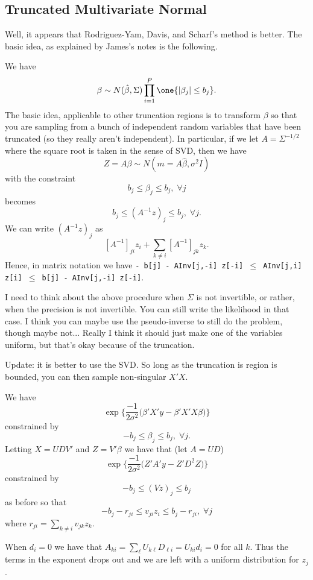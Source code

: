 \documentclass{article}
\begin{document}
\subsection{Truncated Multivariate Normal}

Well, it appears that Rodriguez-Yam, Davis, and Scharf's method is better.  The
basic idea, as explained by James's notes is the following.

We have
\[
\beta \sim N(\hat \beta, \Sigma) \prod_{i=1}^P \one \{|\beta_j| \leq b_j \}.
\]
The basic idea, applicable to other truncation regions is to transform $\beta$
so that you are sampling from a bunch of independent random variables that have
been truncated (so they really aren't independent).  In particular, if we let $A
= \Sigma^{-1/2}$ where the square root is taken in the sense of SVD, then we
have
\[
Z = A\beta \sim N(m = A \hat \beta, \sigma^2 I)
\]
with the constraint
\[
b_j \leq \beta_j \leq b_j, \; \forall j
\]
becomes
\[
b_j \leq (A^{-1} z)_j \leq b_j, \; \forall j.
\]
We can write $(A^{-1} z)_j$ as
\[
[A^{-1}]_{ji} z_i + \sum_{k \neq i} [A^{-1}]_{jk} z_k. 
\]
Hence, in matrix notation we have
\texttt{- b[j] - AInv[j,-i] z[-i] $\leq$ AInv[j,i] z[i] $\leq$ b[j] - AInv[j,-i] z[-i]}.

I need to think about the above procedure when $\Sigma$ is not invertible, or
rather, when the precision is not invertible.  You can still write the
likelihood in that case.  I think you can maybe use the pseudo-inverse to still
do the problem, though maybe not...  Really I think it should just make one of
the variables uniform, but that's okay because of the truncation.

Update: it is better to use the SVD.  So long as the truncation is region is
bounded, you can then sample non-singular $X'X$.

We have 
\[
\exp \Big\{ \frac{-1}{2 \sigma^2} \Big( \beta' X' y - \beta' X'X \beta \Big) \Big\}
\]
constrained by
\[
- b_j \leq \beta_j \leq b_j, \; \forall j.
\]
Letting $X = UDV'$ and $Z = V'\beta$ we have that (let $A = UD$)
\[
\exp \Big\{ \frac{-1}{2 \sigma^2} \Big( Z' A'y - Z' D^2 Z \Big) \Big\}
\]
constrained by
\[
- b_j \leq (Vz)_j \leq b_j
\]
as before so that
\[
-b_j - r_{ji} \leq v_{ji} z_i \leq b_j - r_{ji}, \; \forall j
\]
where $r_{ji} = \sum_{k \neq i} v_{jk} z_k$.

When $d_i = 0$ we have that $A_{ki} = \sum_{\ell} U_{k\ell} D_{\ell i} = U_{ki}
d_i = 0$ for all $k$.  Thus the terms in the exponent drops out and we are left
with a uniform distribution for $z_j$.
\end{document}
